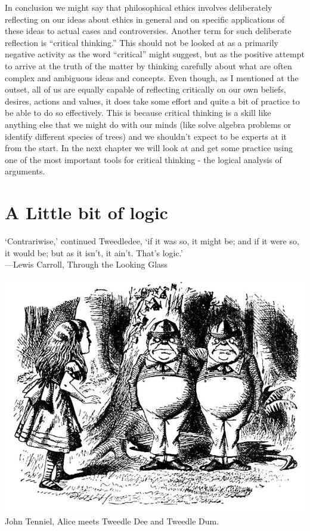 \documentclass[justified]{tufte-book}
\newenvironment{epigraph}%
{
\begin{flushright}    
\begin{minipage}{20em}
\begin{flushright}
\itshape
}%
{
\end{flushright}
\end{minipage}
\end{flushright}
}
\begin{document}
In conclusion we might say that philosophical ethics involves deliberately reflecting on our ideas about ethics in general and on specific applications of these ideas to actual cases and controversies. Another term for such deliberate reflection is ``critical thinking.'' This should not be looked at as a primarily negative activity as the word ``critical'' might suggest, but as the positive attempt to arrive at the truth of the matter by thinking carefully about what are often complex and ambiguous ideas and concepts. Even though, as I mentioned at the outset, all of us are equally capable of reflecting critically on our own beliefs, desires, actions and values, it does take some effort and quite a bit of practice to be able to do so effectively. This is because critical thinking is a skill like anything else that we might do with our minds (like solve algebra problems or identify different species of trees) and we shouldn't expect to be experts at it from the start. In the next chapter we will look at and get some practice using one of the most important tools for critical thinking - the logical analysis of arguments.

\hypertarget{a-little-bit-of-logic}{%
\chapter{A Little bit of logic}\label{a-little-bit-of-logic}}

\begin{epigraph}
`Contrariwise,' continued Tweedledee, `if it was so, it might be; and if
it were so, it would be; but as it isn't, it ain't. That's logic.'\\
---Lewis Carroll, Through the Looking Glass
\end{epigraph}

\begin{marginfigure}
\includegraphics{img/tenniel-tweedle-dee-dum.jpg} John Tenniel, Alice
meets Tweedle Dee and Tweedle Dum.
\end{marginfigure}
\end{document}
